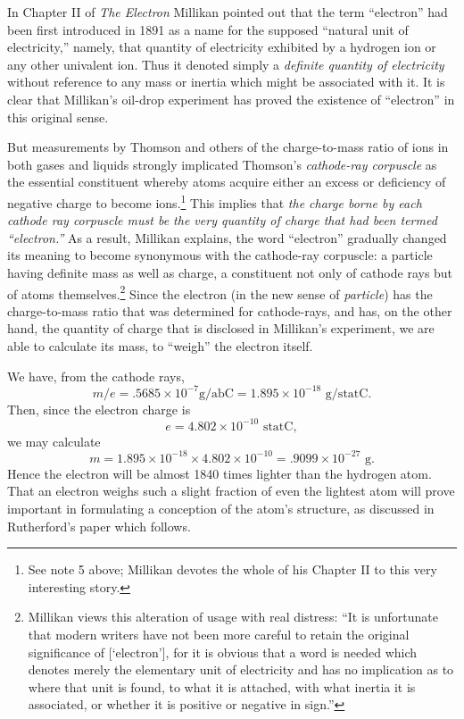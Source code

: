 In Chapter II of \emph{The Electron} Millikan pointed out that the term
``electron'' had been first introduced in 1891 as a name for the
supposed ``natural unit of electricity,'' namely, that quantity of
electricity exhibited by a hydrogen ion or any other univalent ion. Thus
it denoted simply a \emph{definite quantity of electricity} without
reference to any mass or inertia which might be associated with it. It
is clear that Millikan's oil-drop experiment has proved the existence of
``electron'' in this original sense.

But measurements by Thomson and others of the charge-to-mass ratio of
ions in both gases and liquids strongly implicated Thomson's
\emph{cathode-ray corpuscle} as the es\-sen\-tial constituent whereby atoms
acquire either an excess or deficiency of negative charge to become
ions.\footnote{See note 5 above; Millikan devotes the whole of
  his Chapter II to this very interesting story.} This implies that
\emph{the charge borne by each cathode ray corpuscle must be the very
quantity of charge that had been termed ``electron.''} As a result,
Millikan explains, the word ``electron'' gradually changed its meaning
to become synonymous with the cathode-ray corpuscle: a particle having
definite mass as well as charge, a constituent not only of cathode rays
but of atoms themselves.\footnote{Millikan views this alteration of
  usage with real distress: ``It is unfortunate that modern writers have
  not been more careful to retain the original significance of
  {[}`electron'{]}, for it is obvious that a word is needed which
  denotes merely the elementary unit of electricity and has no
  implication as to where that unit is found, to what it is attached,
  with what inertia it is associated, or whether it is positive or
  negative in sign.''} Since the electron (in the new sense of
\emph{particle}) has the charge-to-mass ratio that was determined for
cathode-rays, and has, on the other hand, the quantity of charge that is
disclosed in Millikan's experiment, we are able to calculate its mass,
to ``weigh'' the electron itself.

We have, from the cathode rays,
\begin{equation*}
m/e = .5685 \times 10^{-7} \text{g/abC} = 1.895 \times 10^{-18} \text{ g/statC}.
\end{equation*}
Then, since the electron charge is
\begin{equation*}
e = 4.802 \times 10^{-10} \text{ statC},
\end{equation*}
we may calculate
\begin{equation*}
m = 1.895 \times 10^{-18} \times 4.802 \times 10^{-10} = .9099 \times 10^{-27} \text{ g}.
\end{equation*}
Hence the electron will be almost 1840 times lighter than the hydrogen
atom. That an electron weighs such a slight fraction of even the
lightest atom will prove important in formulating a conception of the
atom's structure, as discussed in Rutherford's paper which follows.

